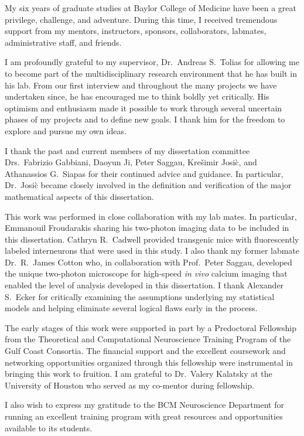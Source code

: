 My six years of graduate studies at Baylor College of Medicine have been a great privilege, challenge, and adventure. During this time, I received tremendous support from my mentors, instructors, sponsors, collaborators, labmates, administrative staff, and friends.

I am profoundly grateful to my supervisor, Dr.\ Andreas S.\ Tolias for allowing me to become part of the multidisciplinary research environment that he has built in his lab. From our first interview and throughout the many projects we have undertaken since, he has encouraged me to think boldly yet critically.  His optimism and enthusiasm made it possible to work through several uncertain phases of my projects and to define new goals.  I thank him for the freedom to explore and pursue my own ideas.

I thank the past and current members of my dissertation committee Drs.\ Fabrizio Gabbiani, Daoyun Ji, Peter Saggau, Kre\v{s}imir Josi\`c, and Athanassios G.\ Siapas  for their continued advice and guidance. In particular, Dr.\ Josi\`c became closely involved in the definition and verification of the major mathematical aspects of this dissertation.

This work was performed in close collaboration with my lab mates. In particular, Emmanouil Froudarakis sharing his two-photon imaging data to be included in this dissertation. Cathryn R.\ Cadwell provided transgenic mice with fluorescently labeled interneurons that were used in this study. I also thank my former labmate Dr.\ R.\ James Cotton who, in collaboration with Prof.~Peter Saggau, developed the unique two-photon microscope for high-speed \emph{in vivo} calcium imaging that enabled the level of analysis developed in this dissertation. I thank Alexander S.\ Ecker for critically examining the assumptions underlying my statistical models and helping eliminate several logical flaws early in the process.

The early stages of this  work were supported in part by a Predoctoral Fellowship from the Theoretical and Computational Neuroscience Training Program of the Gulf Coast Consortia.  The financial support and the excellent coursework and networking opportunities organized through this fellowship were instrumental in bringing this work to fruition. I am grateful to Dr.\ Valery Kalatsky at the University of Houston who served as my co-mentor during fellowship.

I also wish to express my gratitude to the BCM Neuroscience Department for running an excellent training program with great resources and opportunities available to its students.
